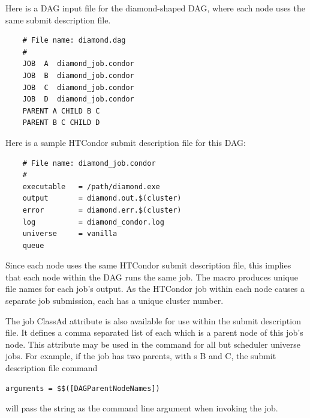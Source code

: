 %
Here is a DAG input file for the diamond-shaped DAG, 
where each node uses the same submit description file.

\begin{verbatim}
    # File name: diamond.dag
    #
    JOB  A  diamond_job.condor 
    JOB  B  diamond_job.condor 
    JOB  C  diamond_job.condor	
    JOB  D  diamond_job.condor
    PARENT A CHILD B C
    PARENT B C CHILD D
\end{verbatim}

Here is a sample HTCondor submit description file
for this DAG:

\begin{verbatim}
    # File name: diamond_job.condor
    #
    executable   = /path/diamond.exe
    output       = diamond.out.$(cluster)
    error        = diamond.err.$(cluster)
    log          = diamond_condor.log
    universe     = vanilla
    queue
\end{verbatim}

Since each node uses the same HTCondor submit description file,
this implies that each node within the DAG runs the
same job.
The  macro
produces unique file names for each job's output.
As the HTCondor job within each node
causes a separate job submission, each has a unique cluster number.

The job ClassAd attribute  is also available
for use within the submit description file. 
It defines a comma separated list of each 
which is a parent node of this job's node.
This attribute may be used in the  command
for all but scheduler universe jobs.
For example, if the job has two parents, with s B and C,
the submit description file command
\begin{verbatim}
arguments = $$([DAGParentNodeNames])
\end{verbatim}
will pass the string  as the command line argument when invoking
the job.

